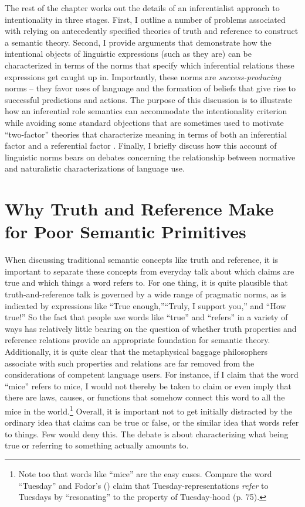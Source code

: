 The rest of the chapter works out the details of an inferentialist approach to intentionality in three stages. First, I outline a number of problems associated with relying on antecedently specified theories of truth and reference to construct a semantic theory. Second, I provide arguments that demonstrate how the intentional objects of linguistic expressions (such as they are) can be characterized in terms of the norms that specify which inferential relations these expressions get caught up in. Importantly, these norms are \textit{success-producing} norms -- they favor uses of language and the formation of beliefs that give rise to successful predictions and actions. The purpose of this discussion is to illustrate how an inferential role semantics can accommodate the intentionality criterion while avoiding some standard objections that are sometimes used to motivate ``two-factor'' theories that characterize meaning in terms of both an inferential factor and a referential factor \citep{Eliasmith:2000,Block:1986}. Finally, I briefly discuss how this account of linguistic norms bears on debates concerning the relationship between normative and naturalistic characterizations of language use. 

\section{Why Truth and Reference Make for Poor Semantic Primitives}

When discussing traditional semantic concepts like truth and reference, it is important to separate these concepts from everyday talk about which claims are true and which things a word refers to. For one thing, it is quite plausible that truth-and-reference talk is governed by a wide range of pragmatic norms, as is indicated by expressions like ``True enough,''``Truly, I support you,'' and ``How true!'' So the fact that people \textit{use} words like ``true'' and ``refers'' in a variety of ways has relatively little bearing on the question of whether truth properties and reference relations provide an appropriate foundation for semantic theory. Additionally, it is quite clear that the metaphysical baggage philosophers associate with such properties and relations are far removed from the considerations of competent language users. For instance, if I claim that the word ``mice'' refers to mice, I would not thereby be taken to claim or even imply that there are laws, causes, or functions that somehow connect this word to all the mice in the world.\footnote{Note too that words like ``mice'' are the easy cases. Compare the word ``Tuesday'' and Fodor's (\citeyear{Fodor:1998}) claim that Tuesday-representations \textit{refer} to Tuesdays by ``resonating'' to the property of Tuesday-hood (p. 75).} Overall, it is important not to get initially distracted by the ordinary idea that claims can be true or false, or the similar idea that words refer to things. Few would deny this. The debate is about characterizing what being true or referring to something actually amounts to.

